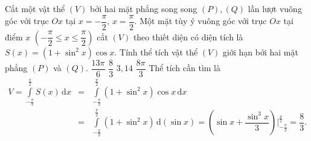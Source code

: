 \begin{ex}%
Cắt một vật thể $(V)$ bởi hai mặt phẳng song song $(P),(Q)$ lần lượt vuông góc với trục $O x$ tại $x=-\dfrac{\pi}{2}$, $x=\dfrac{\pi}{2}$. Một mặt tùy ý vuông góc với trục $O x$ tại điểm $x$ $\left(-\dfrac{\pi}{2}\le x\le\dfrac{\pi}{2}\right)$ cắt $(V)$ theo thiết diện có diện tích là $S(x)=\left(1+\sin^2x\right)\cos x$. Tính thể tích vật thể $(V)$ giới hạn bởi hai mặt phẳng $(P)$ và $(Q)$.
\choice
{$\dfrac{13\pi}{6}$}
{\True $\dfrac{8}{3}$}
{$3{,}14$}
{$\dfrac{8\pi}{3}$}
\loigiai
{
Thể tích cần tìm là
\begin{eqnarray*}
	V=\displaystyle\int\limits_{-\frac{\pi}{2}}^{\frac{\pi}{2}} S(x)\mathrm{\,d}x&=&\displaystyle\int\limits_{-\frac{\pi}{2}}^{\frac{\pi}{2}} \left(1+\sin^2x\right)\cos x\mathrm{\,d}x\\
	&=&\displaystyle\int\limits_{-\frac{\pi}{2}}^{\frac{\pi}{2}}\left(1+\sin^2x\right)\mathrm{\,d}(\sin x)=\left(\sin x+\dfrac{\sin^3x}{3}\right)\bigg|_{-\frac{\pi}{2}}^{\frac{\pi}{2}}=\dfrac{8}{3}.
\end{eqnarray*}
}
\end{ex}

